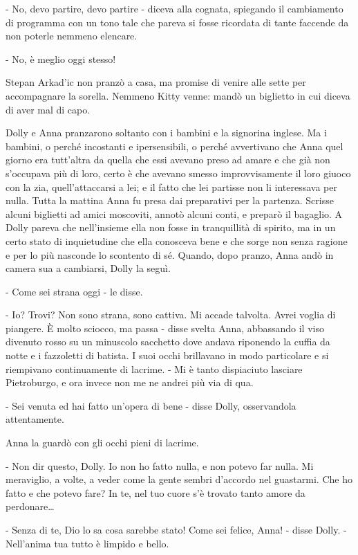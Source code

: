 - No, devo partire, devo partire - diceva alla cognata, spiegando il cambiamento di programma con un tono tale che pareva si fosse ricordata di tante faccende da non poterle nemmeno elencare. 

- No, è meglio oggi stesso! 

Stepan Arkad'ic non pranzò a casa, ma promise di venire alle sette per accompagnare la sorella. Nemmeno Kitty venne: mandò un biglietto in cui diceva di aver mal di capo. 

Dolly e Anna pranzarono soltanto con i bambini e la signorina inglese. Ma i bambini, o perché incostanti e ipersensibili, o perché avvertivano che Anna quel giorno era tutt'altra da quella che essi avevano preso ad amare e che già non s'occupava più di loro, certo è che avevano smesso improvvisamente il loro giuoco con la zia, quell'attaccarsi a lei; e il fatto che lei partisse non li interessava per nulla. Tutta la mattina Anna fu presa dai preparativi per la partenza. Scrisse alcuni biglietti ad amici moscoviti, annotò alcuni conti, e preparò il bagaglio. A Dolly pareva che nell'insieme ella non fosse in tranquillità di spirito, ma in un certo stato di inquietudine che ella conosceva bene e che sorge non senza ragione e per lo più nasconde lo scontento di sé. Quando, dopo pranzo, Anna andò in camera sua a cambiarsi, Dolly la seguì. 

- Come sei strana oggi - le disse. 

- Io? Trovi? Non sono strana, sono cattiva. Mi accade talvolta. Avrei voglia di piangere. È molto sciocco, ma passa - disse svelta Anna, abbassando il viso divenuto rosso su un minuscolo sacchetto dove andava riponendo la cuffia da notte e i fazzoletti di batista. I suoi occhi brillavano in modo particolare e si riempivano continuamente di lacrime. - Mi è tanto dispiaciuto lasciare Pietroburgo, e ora invece non me ne andrei più via di qua. 

- Sei venuta ed hai fatto un'opera di bene - disse Dolly, osservandola attentamente. 

Anna la guardò con gli occhi pieni di lacrime. 

- Non dir questo, Dolly. Io non ho fatto nulla, e non potevo far nulla. Mi meraviglio, a volte, a veder come la gente sembri d'accordo nel guastarmi. Che ho fatto e che potevo fare? In te, nel tuo cuore s'è trovato tanto amore da perdonare\ldots{} 

- Senza di te, Dio lo sa cosa sarebbe stato! Come sei felice, Anna! - disse Dolly. - Nell'anima tua tutto è limpido e bello. 

